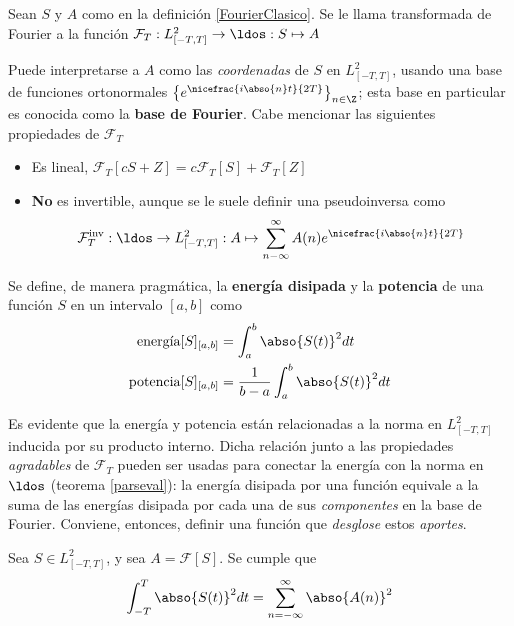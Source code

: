 \begin{definicion}
Sean $S$ y $A$ como en la definición \ref{FourierClasico}. Se le llama transformada de Fourier a la
función $\mathcal{F}_T : L^{2}_{[-T,T]} \rightarrow \ldos : S \mapsto A$
\end{definicion}

Puede interpretarse a $A$ como las \textit{coordenadas} de $S$ en $L^{2}_{[-T,T]}$, usando una base 
de funciones ortonormales $\left\{ e^{\nicefrac{i \abso{n} t}{2 T}} \right\}_{n\in \Z}$; esta base 
en particular es conocida como la \textbf{base de Fourier}.
%
Cabe mencionar las siguientes propiedades de $\mathcal{F}_T$
\begin{itemize}
\item Es lineal, $\mathcal{F}_T[cS + Z] = c\mathcal{F}_T[S] + \mathcal{F}_T[Z]$

\item \textbf{No} es invertible, aunque se le suele definir una pseudoinversa como
\begin{equation*}
\mathcal{F}_{T}^{\text{inv}} : \ldos \rightarrow L^{2}_{[-T,T]} :
A \mapsto \sum_{n -\infty}^{\infty} A(n) e^{\nicefrac{i \abso{n} t}{2 T}}
\end{equation*}
\end{itemize}

Se define, de manera pragmática, la \textbf{energía disipada} y la \textbf{potencia} de una función 
$S$ en un intervalo $[a,b]$ como 
\begin{align}
\text{energía}[S]_{[a,b]} &= \int_a^{b} \abso{S(t)}^{2} dt \nonumber \\
\text{potencia}[S]_{[a,b]} &= \frac{1}{b-a} \int_a^{b} \abso{S(t)}^{2} dt
\label{energia}
\end{align}

Es evidente que la energía y potencia están relacionadas a la norma en $L^{2}_{[-T,T]}$ inducida por
su producto interno.
%
Dicha relación junto a las propiedades \textit{agradables} de $\mathcal{F}_T$ pueden ser usadas 
para conectar la energía con la norma en $\ldos$ (teorema \ref{parseval}): la energía disipada por 
una función equivale a la suma de las energías disipada por cada una de sus \textit{componentes} en 
la base de Fourier.
%
Conviene, entonces, definir una función que \textit{desglose} estos \textit{aportes}.

\begin{teorema}[Parseval]
Sea $S \in L^{2}_{[-T,T]}$, y sea $A = \mathcal{F}[S]$. Se cumple que
\begin{equation*}
\int_{-T}^{T} \abso{S(t)}^{2} dt = \sum_{n=-\infty}^{\infty} \abso{A(n)}^{2}
\end{equation*}
\label{parseval}
\end{teorema}

